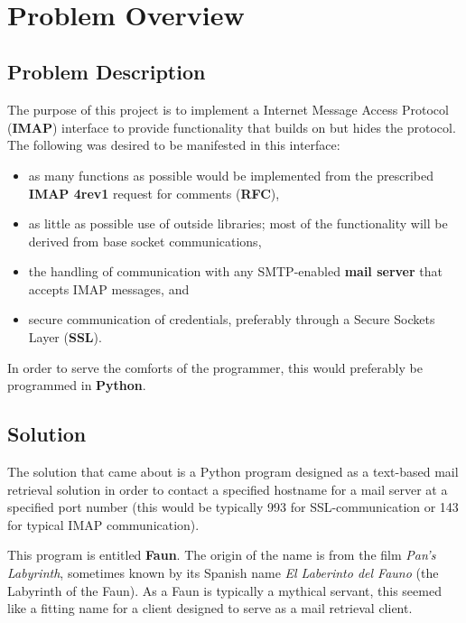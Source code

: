 \documentclass{article}
\title{
\vspace{2in}
\textmd{\textbf{\docClass}}\\
\textmd{\docTitle}\\
\vspace{0.1in}\large{\textit{\docClassInstructor}}\\
\vspace{3in}
}
\author{\textbf{\docAuthorName}}
\date{\docDate}
\newcommand{\enterSectionHeader}[1]{
\nobreak\extramarks{}{}\nobreak
\nobreak\extramarks{}{}\nobreak
}
\newcounter{docSectionCounter} %
\newcommand{\docSectionName}{}
\newenvironment{docSection}[1][Section \arabic{docSectionCounter}]{ %
\stepcounter{docSectionCounter} %
\renewcommand{\docSectionName}{#1} %
\section{\docSectionName} %
\enterSectionHeader{\docSectionName} %
}{
}
\newcommand{\docSubsectionName}{}
\newenvironment{docSubsection}[1]{ %
\renewcommand{\docSubsectionName}{#1} %
\subsection{\docSubsectionName} %
\enterSectionHeader{\docSubsectionName} %
}{
\enterSectionHeader{\docSectionName} %
}
\begin{document}
\maketitle
\newpage
\tableofcontents
\newpage
\onehalfspace



\begin{docSection}[Problem Overview]
\begin{docSubsection}{Problem Description}
The purpose of this project is to implement a Internet Message Access Protocol (\textbf{IMAP}) interface to provide functionality that builds on but hides the protocol. The following was desired to be manifested in this interface:

\begin{itemize}
    \item as many functions as possible would be implemented from the prescribed \textbf{IMAP 4rev1} request for comments (\textbf{RFC}),
    \item as little as possible use of outside libraries; most of the functionality will be derived from base socket communications,
    \item the handling of communication with any SMTP-enabled \textbf{mail server} that accepts IMAP messages, and
    \item secure communication of credentials, preferably through a Secure Sockets Layer (\textbf{SSL}).
\end{itemize}

In order to serve the comforts of the programmer, this would preferably be programmed in \textbf{Python}.
\end{docSubsection}

\begin{docSubsection}{Solution}
The solution that came about is a Python program designed as a text-based mail retrieval solution in order to contact a specified hostname for a mail server at a specified port number (this would be typically 993 for SSL-communication or 143 for typical IMAP communication).

This program is entitled \textbf{Faun}. The origin of the name is from the film \textit{Pan's Labyrinth}, sometimes known by its Spanish name \textit{El Laberinto del Fauno} (the Labyrinth of the Faun). As a Faun is typically a mythical servant, this seemed like a fitting name for a client designed to serve as a mail retrieval client.
\end{docSubsection}

\end{docSection}
\end{document}
